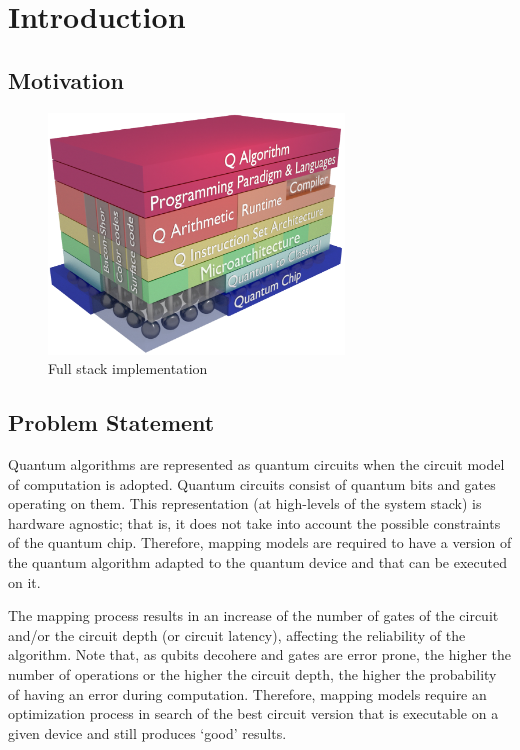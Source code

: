 
\chapter{Introduction}
\label{sec:orga3cd0bf}
\section{Motivation}
\label{sec:orgcd9d217}
\begin{figure}[htbp]
\centering
\includegraphics[width=0.7\textwidth]{figures/system_stack.png}
\caption{\label{fig:system_stack}
Full stack implementation}
\end{figure}

\section{Problem Statement}
\label{sec:orge8770ed}
Quantum algorithms are represented as quantum circuits when the circuit model of computation is adopted. Quantum circuits consist of quantum bits and gates operating on them.
This representation (at high-levels of the system stack) is hardware agnostic; that is, it does not take into account the possible constraints of the quantum chip. Therefore, mapping models are required to have a version of the quantum algorithm adapted to the quantum device and that can be executed on it. 


The mapping process results in an increase of the number of gates of the circuit and/or the circuit depth (or circuit latency), affecting the reliability of the algorithm. Note that, as qubits decohere and gates are error prone, the higher the number of operations or the higher the circuit depth, the higher the probability of having an error during computation.  Therefore, mapping models require an optimization process in search of the best circuit version that is executable on a given device and still produces `good' results.

